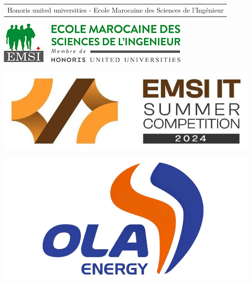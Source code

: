 \documentclass[a4paper, oneside, 12pt, final]{extreport}
\title{\reportSubject}
\author{\reportAuthor}
\newcommand{\EMSI} {%
  Ecole Marocaine des Sciences de l'Ing\'enieur
}
\begin{document}
\thispagestyle{empty}
\begin{titlepage}
\begin{center}




{%
  \fontsize{9pt}{9pt}\selectfont%
  \begin{tabular}{c}
    Honoris united universities - \EMSI{} \\
  \end{tabular}
}

\vspace{1cm}

\noindent
\begin{minipage}[t]{0.3\textwidth}
    \includegraphics[scale=0.4]{EMSI_logo2.png}
\end{minipage}%
\hfill
\begin{minipage}[t]{0.3\textwidth}
    \centering
    \includegraphics[scale=0.25]{1719353722626.jpeg}
\end{minipage}%
\hfill
\begin{minipage}[t]{0.3\textwidth}
    \raggedleft
    \includegraphics[scale=0.17]{ola-energy-041-removebg-preview.png}
\end{minipage}


\end{center}
\end{titlepage}
\end{document}
